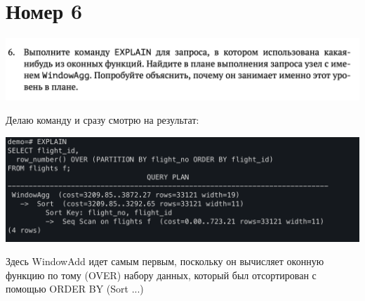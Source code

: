 \documentclass[a4paper,12pt]{article}
\begin{document}
\section*{Номер 6}
\begin{center}
\includegraphics[scale=0.4]{t6.png}
\end{center}
Делаю команду и сразу смотрю на результат:
\begin{center}
\includegraphics[scale=0.6]{63.png}
\end{center}
Здесь WindowAdd идет самым первым, поскольку он вычисляет оконную функцию по тому (OVER) набору данных, который был отсортирован с помощью ORDER BY (Sort ...)
\clearpage
\end{document}
